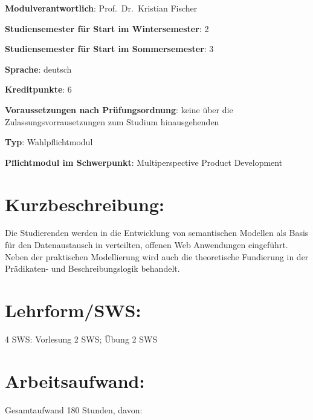 \begin{modulHead}
\textbf{Modulverantwortlich}: Prof.~Dr.~Kristian
Fischer
\end{modulHead}
\begin{modulHead}
\textbf{Studiensemester für
Start im Wintersemester}:
2
\end{modulHead}
\begin{modulHead}
\textbf{Studiensemester für Start
im Sommersemester}:
3
\end{modulHead}
\begin{modulHead}
\textbf{Sprache}:
deutsch
\end{modulHead}
\begin{modulHead}
\textbf{Kreditpunkte}:
6
\end{modulHead}
\begin{modulHead}
\textbf{Voraussetzungen nach
Prüfungsordnung}: keine über die Zulassungsvorrausetzungen zum Studium
hinausgehenden
\end{modulHead}
\begin{modulHead}
\textbf{Typ}:
Wahlpflichtmodul
\end{modulHead}
\begin{modulHead}
\textbf{Pflichtmodul
im Schwerpunkt}: Multiperspective Product Development
\end{modulHead}


\section*{Kurzbeschreibung:}\label{kurzbeschreibung-12}

Die Studierenden werden in die Entwicklung von semantischen Modellen als
Basis für den Datenaustausch in verteilten, offenen Web Anwendungen
eingeführt. Neben der praktischen Modellierung wird auch die
theoretische Fundierung in der Prädikaten- und Beschreibungslogik
behandelt.

\section*{Lehrform/SWS:}\label{lehrformsws-20}

4 SWS: Vorlesung 2 SWS; Übung 2 SWS

\section*{Arbeitsaufwand:}\label{arbeitsaufwand-21}

Gesamtaufwand 180 Stunden, davon:

